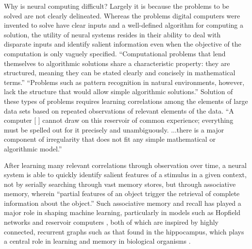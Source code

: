 

\vspace{3em}
Why is neural computing difficult? Largely it is because the problems to be solved are not clearly delineated. Whereas the problems digital computers were invented to solve have clear inputs and a well-defined algorithm for computing a solution, the utility of neural systems resides in their ability to deal with disparate inputs and identify salient information even when the objective of the computation is only vaguely specified. ``Computational problems that lend themselves to algorithmic solutions share a characteristic property: they are structured, meaning they can be stated clearly and concisely in mathematical terms.'' \cite{abps1987} ``Problems such as pattern recognition in natural environments, however, lack the structure that would allow simple algorithmic solutions.'' \cite{abps1987} Solution of these types of problems requires learning correlations among the elements of large data sets based on repeated observations of relevant elements of the data. ``A computer [ ] cannot draw on this reservoir of common experience; everything must be spelled out for it precisely and unambiguously. ...there is a major component of irregularity that does not fit any simple mathematical or algorithmic model.'' \cite{abps1987}

After learning many relevant correlations through observation over time, a neural system is able to quickly identify salient features of a stimulus in a given context, not by serially searching through vast memory stores, but through associative memory, wherein ``partial features of an object trigger the retrieval of complete information about the object.'' \cite{abps1987} Such associative memory and recall has played a major role in shaping machine learning, particularly in models such as Hopfield networks \cite{ho1982} and reservoir computers \cite{}, both of which are inspired by highly connected, recurrent graphs such as that found in the hippocampus, which plays a central role in learning and memory in biological organisms \cite{}.

